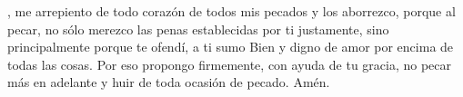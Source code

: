 , me arrepiento de todo corazón de todos mis pecados y los aborrezco, porque al pecar, no sólo merezco las penas establecidas 
por ti justamente, sino principalmente porque te ofendí, a ti sumo Bien y digno de amor por encima de todas las cosas. Por eso propongo firmemente, 
con ayuda de tu gracia, no pecar más en adelante y huir de toda ocasión de pecado. Amén.
